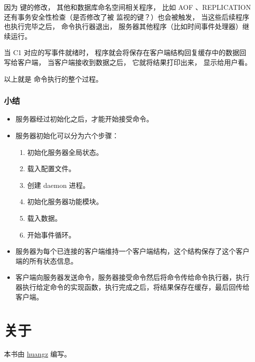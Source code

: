 \documentclass[a4paper,11pt,english]{sphinxmanual}
\begin{document}
因为  键的修改，
其他和数据库命名空间相关程序，
比如 AOF 、REPLICATION 还有事务安全性检查（是否修改了被  监视的键？）也会被触发，
当这些后续程序也执行完毕之后，
命令执行器退出，
服务器其他程序（比如时间事件处理器）继续运行。

当 C1 对应的写事件就绪时，
程序就会将保存在客户端结构回复缓存中的数据回写给客户端，
当客户端接收到数据之后，
它就将结果打印出来，
显示给用户看。

以上就是  命令执行的整个过程。


\subsection{小结}
\label{internal/redis:id10}\begin{itemize}
\item {} 
服务器经过初始化之后，才能开始接受命令。

\item {} 
服务器初始化可以分为六个步骤：
\begin{enumerate}
\item {} 
初始化服务器全局状态。

\item {} 
载入配置文件。

\item {} 
创建 daemon 进程。

\item {} 
初始化服务器功能模块。

\item {} 
载入数据。

\item {} 
开始事件循环。

\end{enumerate}

\item {} 
服务器为每个已连接的客户端维持一个客户端结构，这个结构保存了这个客户端的所有状态信息。

\item {} 
客户端向服务器发送命令，服务器接受命令然后将命令传给命令执行器，执行器执行给定命令的实现函数，执行完成之后，将结果保存在缓存，最后回传给客户端。

\end{itemize}


\chapter{关于}
\label{index:id6}
本书由 \href{http://huangz.me/}{huangz} 编写。
\end{document}
